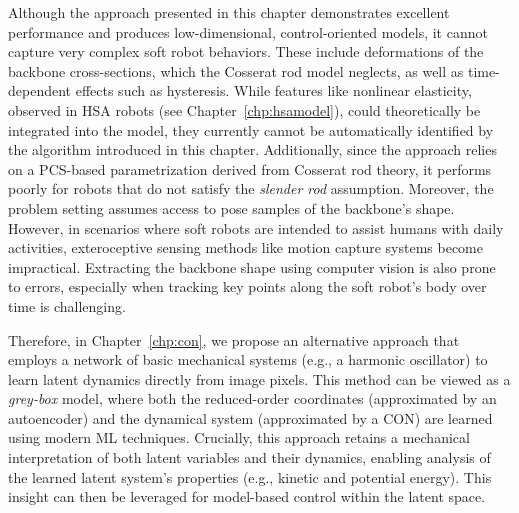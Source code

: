 Although the approach presented in this chapter demonstrates excellent performance and produces low-dimensional, control-oriented models, it cannot capture very complex soft robot behaviors. These include deformations of the backbone cross-sections, which the Cosserat rod model neglects, as well as time-dependent effects such as hysteresis. While features like nonlinear elasticity, observed in \gls{HSA} robots (see Chapter~\ref{chp:hsamodel}), could theoretically be integrated into the model, they currently cannot be automatically identified by the algorithm introduced in this chapter.
Additionally, since the approach relies on a \gls{PCS}-based parametrization derived from Cosserat rod theory, it performs poorly for robots that do not satisfy the \emph{slender rod} assumption. Moreover, the problem setting assumes access to pose samples of the backbone’s shape. However, in scenarios where soft robots are intended to assist humans with daily activities, exteroceptive sensing methods like motion capture systems become impractical. Extracting the backbone shape using computer vision is also prone to errors, especially when tracking key points along the soft robot’s body over time is challenging. 

Therefore, in Chapter~\ref{chp:con}, we propose an alternative approach that employs a network of basic mechanical systems (e.g., a harmonic oscillator) to learn latent dynamics directly from image pixels. This method can be viewed as a \emph{grey-box} model, where both the reduced-order coordinates (approximated by an autoencoder) and the dynamical system (approximated by a \gls{CON}) are learned using modern \gls{ML} techniques. Crucially, this approach retains a mechanical interpretation of both latent variables and their dynamics, enabling analysis of the learned latent system’s properties (e.g., kinetic and potential energy). This insight can then be leveraged for model-based control within the latent space.